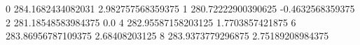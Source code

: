 0 284.1682434082031 2.982757568359375
1 280.72222900390625 -0.4632568359375
2 281.18548583984375 0.0
4 282.95587158203125 1.7703857421875
6 283.86956787109375 2.68408203125
8 283.9373779296875 2.75189208984375
